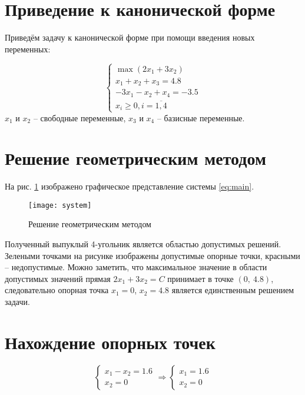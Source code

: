 \section{Приведение к канонической форме}

Приведём задачу к канонической форме при помощи введения новых переменных:

\begin{equation}
\begin{cases}
	\max \left( 2 x_1 + 3 x_2 \right) \\
	x_1 + x_2 + x_3 = 4.8 \\
	-3 x_1 - x_2 + x_4 = -3.5 \\
	x_i \ge 0, i = \overline{1,4}
\end{cases}
\end{equation}
$x_1$ и $x_2$ -- свободные переменные, $x_3$ и $x_4$ -- базисные переменные. 

\section{Решение геометрическим методом}

На рис. \ref{pic:geometric_solution} изображено графическое представление системы \ref{eq:main}.

\begin{figure}[H]
\begin{center}
	\texttt{[image: system]}
	\caption{Решение геометрическим методом}
	\label{pic:geometric_solution}
\end{center}
\end{figure}

Полученный выпуклый 4-угольник является областью допустимых решений. Зелеными точками на рисунке изображены допустимые опорные точки, красными -- недопустимые. Можно заметить, что максимальное значение в области допустимых значений прямая $2x_1 + 3x_2 = C$ принимает в точке $(0,\ 4.8)$, следовательно опорная точка $x_1 = 0$, $x_2 = 4.8$ является единственным решением задачи.

\section{Нахождение опорных точек}
\begin{equation}
\begin{cases}
	x_1 - x_2 = 1.6
	\\
	x_2 = 0
\end{cases}
\Rightarrow
\begin{cases}
	x_1 = 1.6
	\\
	x_2 = 0
\end{cases}
\end{equation}
